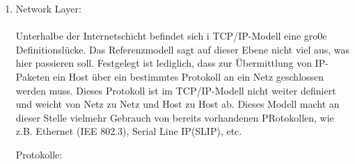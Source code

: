 \documentclass[11pt]{article}
\begin{document}
\begin{enumerate}
\begin{addmargin}[1em]{1em}
\begin{enumerate}
                \item IGRP (Interior Gateway Routin Protocol) - Informationsaustausch zwischen Routern (Distanzvektor)
                (veraltet - ersetzt durch EIGRP)\\

                \item OSPF (Open Shortes Path First) - Informationsaustausch zwischen Routern (Linkzustand) via IP\\

                \item BGP (Border Gateway Protocol) - Informationsaustausch zwischen autonomen Systemen im Internet via TCP\\

                \item RIP (Routing Information Protocol) - Informationsaustausch zwischen Routern vid UDP\\

                \item IGMP (Internet Group Management) - Organisation von Multicast-Gruppen, Bestandteil von IP auf allen Hosts,
                die den Empfang von IP-Multicast unterstützen\\

            \end{enumerate}
        \end{addmargin}

        \item Network Layer:\\\\
        Unterhalbe der Internetschicht befindet sich i TCP/IP-Modell eine gro0e Definitionslücke.
        Das Referenzmodell sagt auf dieser Ebene nicht viel aus, was hier passieren soll. Festgelegt ist
        lediglich, dass zur Übermittlung von IP-Paketen ein Host über ein bestimmtes Protokoll an ein Netz
        geschlossen werden muss. Dieses Protokoll ist im TCP/IP-Modell nicht weiter definiert und weicht
        von Netz zu Netz und Host zu Host ab. Dieses Modell macht an dieser Stelle vielmehr Gebrauch von
        bereits vorhandenen PRotokollen, wie z.B. Ethernet (IEE 802.3), Serial Line IP(SLIP), etc.\\


        \begin{addmargin}[1em]{1em}
            Protokolle:\\

            \begin{enumerate}


\end{enumerate}
\end{addmargin}
\end{enumerate}
\end{document}
